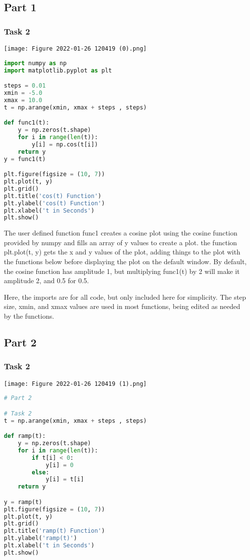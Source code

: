 \documentclass[11pt,a4]{article}
\begin{document}
\subsection{Part 1}

\subsubsection{Task 2}

\texttt{[image: Figure 2022-01-26 120419 (0).png]}

\begin{lstlisting}[language=Python]
import numpy as np
import matplotlib.pyplot as plt

steps = 0.01
xmin = -5.0
xmax = 10.0
t = np.arange(xmin, xmax + steps , steps)

def func1(t):
    y = np.zeros(t.shape)
    for i in range(len(t)):
        y[i] = np.cos(t[i])
    return y
y = func1(t)

plt.figure(figsize = (10, 7))
plt.plot(t, y)
plt.grid()
plt.title('cos(t) Function')
plt.ylabel('cos(t) Function')
plt.xlabel('t in Seconds')
plt.show()
\end{lstlisting}

The user defined function func1 creates a cosine plot using the cosine function provided by numpy and fills an array of y values to create a plot. the function plt.plot(t, y) gets the x and y values of the plot, adding things to the plot with the functions below before displaying the plot on the default window. By default, the cosine function has amplitude 1, but multiplying func1(t) by 2 will make it amplitude 2, and 0.5 for 0.5.

Here, the imports are for all code, but only included here for simplicity. The step size, xmin, and xmax values are used in most functions, being edited as needed by the functions.


\subsection{Part 2}

\subsubsection{Task 2}

\texttt{[image: Figure 2022-01-26 120419 (1).png]}

\begin{lstlisting}[language=Python]
# Part 2

# Task 2
t = np.arange(xmin, xmax + steps , steps)

def ramp(t):
    y = np.zeros(t.shape)
    for i in range(len(t)):
        if t[i] < 0:
            y[i] = 0
        else:
            y[i] = t[i]
    return y

y = ramp(t)
plt.figure(figsize = (10, 7))
plt.plot(t, y)
plt.grid()
plt.title('ramp(t) Function')
plt.ylabel('ramp(t)')
plt.xlabel('t in Seconds')
plt.show()
\end{lstlisting}
\end{document}
